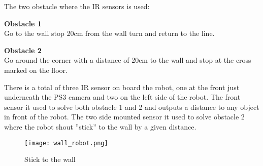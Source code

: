 The two obstacle where the IR sensors is used:
\begin{itemize}
	\begin{item}
		\textbf{ Obstacle 1}\\ Go to the wall stop 20cm from the wall turn and return to the line.
	\end{item}
	
	\begin{item}
		\textbf{ Obstacle 2}\\Go around the corner with a distance of 20cm to the wall and stop at the cross marked on the floor. 
	\end{item}
\end{itemize}

There is a total of three IR sensor on board the robot, one at the front just underneath the PS3 camera and two on the left side of the robot. The front sensor it used to solve both obstacle 1 and 2 and outputs a distance to any object in front of the robot. The two side mounted sensor it used to solve obstacle 2 where the robot shout ''stick'' to the wall by a given distance. 
  \begin{figure}[!h!]
	\centering
	\texttt{[image: wall\_robot.png]}
	\caption{Stick to the wall}
	\label{fig:3}
\end{figure}



      





